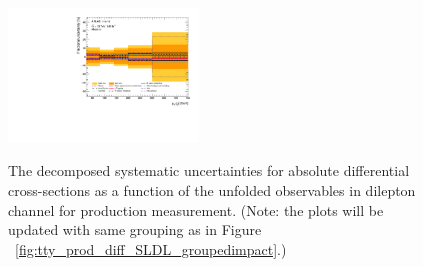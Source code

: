 \begin{figure}[ht]
  \includegraphics[width=0.45\textwidth]{figures/diff_xsec/groupedimpact-absolute-xsec//tty_prod_DL/Uncertainty_tty_ptj1.pdf}\\%
\caption{The decomposed systematic uncertainties for absolute differential cross-sections as a function of the unfolded observables in dilepton channel for \tty production measurement.
 (Note: the plots will be updated with same grouping as in Figure ~\ref{fig:tty_prod_diff_SLDL_groupedimpact}.)}
\label{fig:tty_prod_diff_DL1_groupedimpact}
\end{figure}
\FloatBarrier


